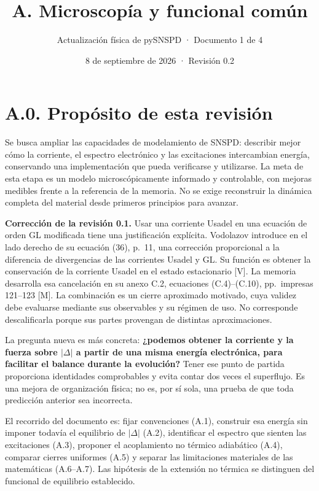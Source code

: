 \documentclass[
  spanish,
  10pt,
  a4paper,
]{article}
\title{A. Microscopía y funcional común}
\subtitle{Actualización física de pySNSPD · Documento 1 de 4}
\author{}
\date{8 de septiembre de 2026 · Revisión 0.2}
\begin{document}
\maketitle

{
\setcounter{tocdepth}{2}
\tableofcontents
}
\newpage

\section{A.0. Propósito de esta
revisión}\label{a.0.-propuxf3sito-de-esta-revisiuxf3n}

Se busca ampliar las capacidades de modelamiento de SNSPD: describir
mejor cómo la corriente, el espectro electrónico y las excitaciones
intercambian energía, conservando una implementación que pueda
verificarse y utilizarse. La meta de esta etapa es un modelo
microscópicamente informado y controlable, con mejoras medibles frente a
la referencia de la memoria. No se exige reconstruir la dinámica
completa del material desde primeros principios para avanzar.

\textbf{Corrección de la revisión 0.1.} Usar una corriente Usadel en una
ecuación de orden GL modificada tiene una justificación explícita.
Vodolazov introduce en el lado derecho de su ecuación (36), p.~11, una
corrección proporcional a la diferencia de divergencias de las
corrientes Usadel y GL. Su función es obtener la conservación de la
corriente Usadel en el estado estacionario {[}V{]}. La memoria
desarrolla esa cancelación en su anexo C.2, ecuaciones (C.4)--(C.10),
pp.~impresas 121--123 {[}M{]}. La combinación es un cierre aproximado
motivado, cuya validez debe evaluarse mediante sus observables y su
régimen de uso. No corresponde descalificarla porque sus partes
provengan de distintas aproximaciones.

La pregunta nueva es más concreta: \textbf{¿podemos obtener la corriente
y la fuerza sobre \(|\Delta|\) a partir de una misma energía
electrónica, para facilitar el balance durante la evolución?} Tener ese
punto de partida proporciona identidades comprobables y evita contar dos
veces el superflujo. Es una mejora de organización física; no es, por sí
sola, una prueba de que toda predicción anterior sea incorrecta.

El recorrido del documento es: fijar convenciones (A.1), construir esa
energía sin imponer todavía el equilibrio de \(|\Delta|\) (A.2),
identificar el espectro que sienten las excitaciones (A.3), proponer el
acoplamiento no térmico adiabático (A.4), comparar cierres uniformes
(A.5) y separar las limitaciones materiales de las matemáticas
(A.6--A.7). Las hipótesis de la extensión no térmica se distinguen del
funcional de equilibrio establecido.
\end{document}
